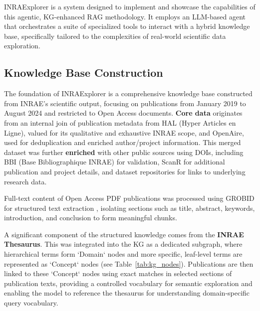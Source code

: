 \documentclass{ecai}
\begin{document}
INRAExplorer is a system designed to implement and showcase the capabilities of this agentic, KG-enhanced RAG methodology. It employs an LLM-based agent that orchestrates a suite of specialized tools to interact with a hybrid knowledge base, specifically tailored to the complexities of real-world scientific data exploration.

\subsection{Knowledge Base Construction}

The foundation of INRAExplorer is a comprehensive knowledge base constructed from INRAE's scientific output, focusing on publications from January 2019 to August 2024 and restricted to Open Access documents.
\textbf{Core data} originates from an internal join of publication metadata from HAL (Hyper Articles en Ligne), valued for its qualitative and exhaustive INRAE scope, and OpenAire, used for deduplication and enriched author/project information. This merged dataset was further \textbf{enriched} with other public sources using DOIs, including BBI (Base Bibliographique INRAE) for validation, ScanR for additional publication and project details, and dataset repositories for links to underlying research data.

Full-text content of Open Access PDF publications was processed using GROBID for structured text extraction \citep{lopez2009grobid}, isolating sections such as title, abstract, keywords, introduction, and conclusion to form meaningful chunks.

A significant component of the structured knowledge comes from the \textbf{INRAE Thesaurus}. This was integrated into the KG as a dedicated subgraph, where hierarchical terms form `Domain` nodes and more specific, leaf-level terms are represented as `Concept` nodes (see Table~\ref{tab:kg_nodes}). Publications are then linked to these `Concept` nodes using exact matches in selected sections of publication texts, providing a controlled vocabulary for semantic exploration and enabling the model to reference the thesaurus for understanding domain-specific query vocabulary.
\end{document}
